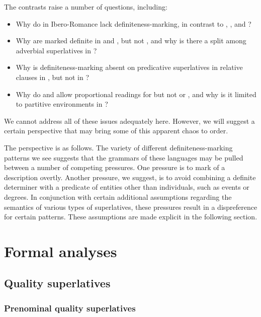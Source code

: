 \documentclass[output=paper
,modfonts
,nonflat]{langsci/langscibook}
\begin{document}
The contrasts raise a number of questions, including:
\begin{itemize}
\item Why do  in Ibero-Romance lack definiteness-marking, in contrast to , , and ?
\item Why are  marked definite in  and , but not , and why is there a split among adverbial superlatives in ?
\item Why is definiteness-marking absent on predicative superlatives in relative clauses in , but not in ?
\item Why do  and  allow proportional readings for  but not  or , and why is it limited to partitive environments in ?
\end{itemize}

We cannot address all of these issues adequately here. However, we will suggest a certain perspective that may bring some of this apparent chaos to order.

The perspective is as follows.  The variety of different definiteness-marking patterns we see suggests that the grammars of these languages may be pulled between a number of competing pressures. One pressure is to mark  of a description overtly. Another pressure, we suggest, is to avoid combining a definite determiner with a predicate of entities other than individuals, such as events or degrees. In conjunction with certain additional assumptions regarding the semantics of various types of superlatives, these pressures result in a dispreference for certain patterns. These assumptions are made explicit in the following section.

\section{Formal analyses} \label{sec:coppockstrand:6}

\subsection{Quality superlatives}

\subsubsection{Prenominal quality superlatives}
\end{document}
